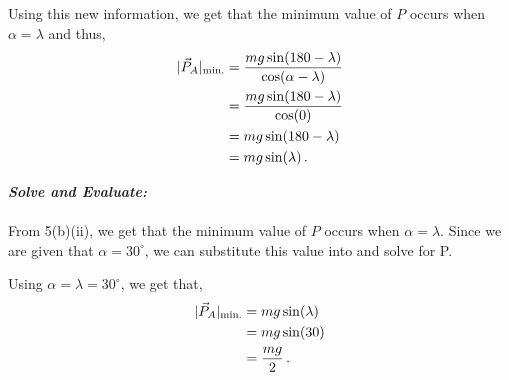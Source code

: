 \begin{subquestions}
\begin{subsubquestions}
	Using this new information, we get that the minimum value of $P$ occurs when $\alpha=\lambda$ and thus,
	\begin{align}
		|\vec{P}_{A}|_{\text{min.}} & = \frac{mg\sin(180-\lambda)}{\cos(\alpha-\lambda)} \nonumber \\
		& = \frac{mg\sin(180-\lambda)}{\cos(0)} \nonumber \\
		& = mg\sin(180-\lambda) \nonumber \\
		& = mg\sin(\lambda) \,. \label{2014:q55:MinP}
	\end{align}

	
	\subsubquestion
	
	\textbf{\textit{Solve and Evaluate:}} \\ \\
	From 5(b)(ii), we get that the minimum value of $P$ occurs when $\alpha=\lambda$. Since we are given that $\alpha=30^\circ$, we can substitute this value into  and solve for P.
	
	Using $\alpha=\lambda=30^\circ$, we get that,
	\begin{align}
		|\vec{P}_{A}|_{\text{min.}} & = mg\sin(\lambda) \nonumber \\
		& = mg\sin(30) \nonumber \\
		& = \frac{mg}{2} \,.
	\end{align}
	
\end{subsubquestions}

\end{subquestions}